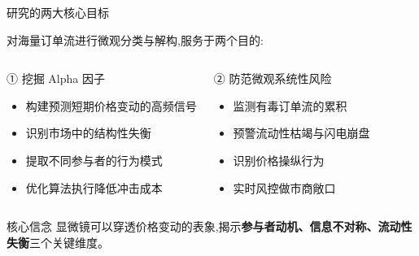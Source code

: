 \documentclass[10pt,aspectratio=169]{beamer}
\begin{document}
\begin{frame}{研究的两大核心目标}

  对海量订单流进行微观分类与解构,服务于两个目的:

  \vfill

  \begin{columns}[t]
    \begin{block}{① 挖掘 Alpha 因子}
      \begin{itemize}
        \item 构建预测短期价格变动的高频信号
        \item 识别市场中的结构性失衡
        \item 提取不同参与者的行为模式
        \item 优化算法执行降低冲击成本
      \end{itemize}
    \end{block}

    \begin{block}{② 防范微观系统性风险}
      \begin{itemize}
        \item 监测有毒订单流的累积
        \item 预警流动性枯竭与闪电崩盘
        \item 识别价格操纵行为
        \item 实时风控做市商敞口
      \end{itemize}
    \end{block}
  \end{columns}

  \vfill

  \begin{alertblock}{核心信念}
    显微镜可以穿透价格变动的表象,揭示\textbf{参与者动机、信息不对称、流动性失衡}三个关键维度。
  \end{alertblock}

\end{frame}
\end{document}
